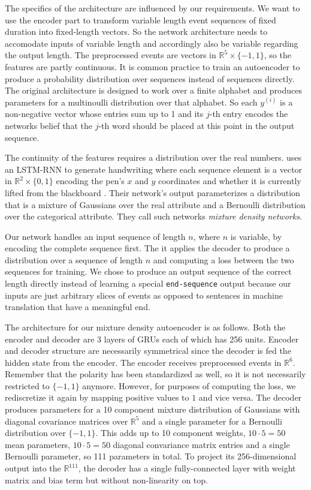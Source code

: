 The specifics of the architecture are influenced by our requirements. We want to
use the encoder part to transform variable length event sequences of fixed
duration into fixed-length vectors. So the network architecture needs to
accomodate inputs of variable length and accordingly also be variable regarding
the output length. The preprocessed events are vectors in $\mathbb{R}^{5} \times
\{ -1, 1 \}$, so the features are partly continuous. It is common practice to
train an autoencoder to produce a probability distribution over sequences
instead of sequences directly. The original architecture is designed to work
over a finite alphabet and produces parameters for a multinoulli distribution
over that alphabet. So each $y^{(i)}$ is a non-negative vector whose entries sum
up to 1 and its $j$-th entry encodes the networks belief that the $j$-th word
should be placed at this point in the output sequence.

The continuity of the features requires a distribution over the real numbers.
\citeauthor{handwriting} uses an LSTM-RNN to generate handwriting where each
sequence element is a vector in $\mathbb{R}^{2} \times \{ 0, 1 \}$ encoding the
pen's $x$ and $y$ coordinates and whether it is currently lifted from the
blackboard \cite{handwriting}. Their network's output parameterizes a
distribution that is a mixture of Gaussians over the real attribute and a
Bernoulli distribution over the categorical attribute. They call such networks
\emph{mixture density networks}.

Our network handles an input sequence of length $n$, where $n$ is variable, by
encoding the complete sequence first. The it applies the decoder to produce a
distribution over a sequence of length $n$ and computing a loss between the two
sequences for training. We chose to produce an output sequence of the correct
length directly instead of learning a special \texttt{end-sequence} output
because our inputs are just arbitrary slices of events as opposed to sentences
in machine translation that have a meaningful end.

The architecture for our mixture density autoencoder is as follows. Both the
encoder and decoder are 3 layers of GRUs each of which has 256 units. Encoder
and decoder structure are necessarily symmetrical since the decoder is fed the
hidden state from the encoder. The encoder receives preprocessed events in
$\mathbb{R}^{6}$. Remember that the polarity has been standardized as well, so
it is not necessarily restricted to $\{ -1, 1 \}$ anymore. However, for purposes
of computing the loss, we rediscretize it again by mapping positive values to
$1$ and vice versa. The decoder produces parameters for a 10 component mixture
distribution of Gaussians with diagonal covariance matrices over
$\mathbb{R}^{5}$ and a single parameter for a Bernoulli distribution over $\{
-1, 1 \}$. This adds up to 10 component weights, $10 \cdot 5 = 50$ mean
parameters, $10 \cdot 5 = 50$ diagonal convariance matrix entries and a single
Bernoulli parameter, so 111 parameters in total. To project its 256-dimensional
output into the $\mathbb{R}^{111}$, the decoder has a single fully-connected
layer with weight matrix and bias term but without non-linearity on top.

